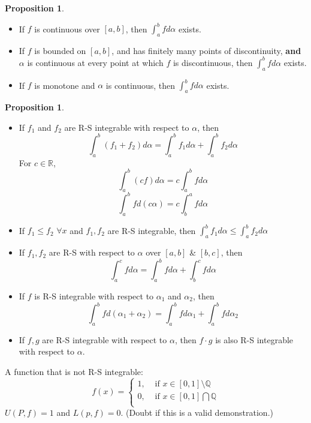 \documentclass[12pt]{article}
\newcommand{\Q}{{\mathbb Q}}
\newcommand{\R}{{\mathbb R}}
\theoremstyle{definition}
\newtheorem{proposition}[theorem]{Proposition}
\theoremstyle{plain}
\begin{document}
\begin{proposition}
    \begin{itemize}
        \item If $f$ is continuous over $[a,b]$, then $\int_a^b fd\alpha$
            exists.
        \item If $f$ is bounded on $[a,b]$, and has finitely many points of
            discontinuity, \textbf{and} $\alpha$ is continuous at every point at
            which $f$ is discontinuous, then $\int_a^b fd\alpha$ exists.
        \item If $f$ is monotone and $\alpha$ is continuous, then $\int_a^b
            f d\alpha$ exists.
    \end{itemize}
\end{proposition}

\begin{proposition}
    \begin{itemize}
        \item If $f_1$ and $f_2$ are R-S integrable with respect to $\alpha$, then
            \[
                \int_a^b (f_1 + f_2) d\alpha = \int_a^b f_1 d\alpha + \int_a^b f_2
                d\alpha
            \]
            For $c \in \R$,
            \[
                \int_a^b (c f) d\alpha = c \int_a^b f d\alpha
            \]
            \[
                \int_a^b f d (c \alpha) = c \int_{b}^{a} f d\alpha
            \]

        \item If $f_1 \le f_2$ $\forall x$ and $f_1, f_2$ are R-S integrable,
            then $\int_a^b f_1 d\alpha \le \int_a^b f_2 d\alpha$

        \item If $f_1, f_2$ are R-S with respect to $\alpha$ over $[a,b]$ \&
            $[b,c]$, then
            \[
                \int_a^c f d\alpha = \int_a^b f d\alpha + \int_b^c f d\alpha
            \]
        \item If $f$ is R-S integrable with respect to $\alpha_1$ and
            $\alpha_2$, then
            \[
                \int_a^b f d(\alpha_1 + \alpha_2) = \int_a^b f d\alpha_1 +
                \int_a^b f d\alpha _2
            \]
        \item If $f,g$ are R-S integrable with respect to $\alpha$, then $f\cdot
            g$ is also R-S integrable with respect to $\alpha$.
    \end{itemize}
\end{proposition}

\begin{example}
    A function that is not R-S integrable:
    \[
        f(x) = \begin{cases}
            1, &\text{ if }x \in [0,1] \setminus \Q \\
            0, &\text{ if }x \in [0,1] \bigcap \Q \\
        \end{cases}
    \]
    $U(P,f) = 1$ and $L(p,f) = 0$. (Doubt if this is a valid demonstration.)
\end{example}
\end{document}
